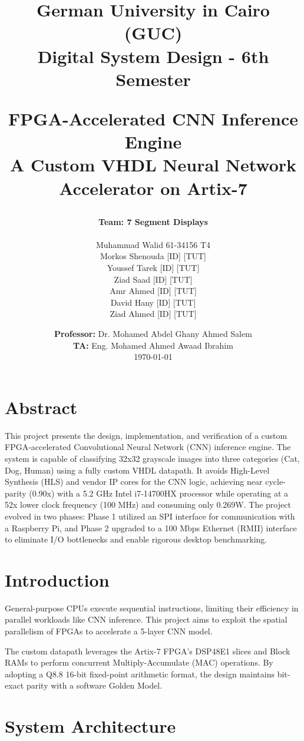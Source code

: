 \documentclass[12pt,a4paper]{article}
\title{
    \vspace{-2cm}
    \begin{center}
        \Large \textbf{German University in Cairo (GUC)} \\
        \large Digital System Design - 6th Semester \\
    \end{center}
    \vspace{2cm}
    \textbf{FPGA-Accelerated CNN Inference Engine} \\
    \large A Custom VHDL Neural Network Accelerator on Artix-7
}
\author{
    \textbf{Team: 7 Segment Displays} \\[0.5cm]
    \normalsize
    \begin{tabular}{c}
        Muhammad Walid 61-34156 T4 \\
        Morkos Shenouda [ID] [TUT] \\
        Youssef Tarek [ID] [TUT] \\
        Ziad Saad [ID] [TUT] \\
        Amr Ahmed [ID] [TUT] \\
        David Hany [ID] [TUT] \\
        Ziad Ahmed [ID] [TUT]
    \end{tabular}
}
\date{\vspace{1cm}
    \textbf{Professor:} Dr. Mohamed Abdel Ghany Ahmed Salem \\
    \textbf{TA:} Eng. Mohamed Ahmed Awaad Ibrahim \\
    \today
}
\begin{document}
\maketitle
\newpage
\tableofsections
\tableofcontents
\newpage

\section{Abstract}
This project presents the design, implementation, and verification of a custom FPGA-accelerated Convolutional Neural Network (CNN) inference engine. The system is capable of classifying 32x32 grayscale images into three categories (Cat, Dog, Human) using a fully custom VHDL datapath. It avoids High-Level Synthesis (HLS) and vendor IP cores for the CNN logic, achieving near cycle-parity (0.90x) with a 5.2 GHz Intel i7-14700HX processor while operating at a 52x lower clock frequency (100 MHz) and consuming only 0.269W. The project evolved in two phases: Phase 1 utilized an SPI interface for communication with a Raspberry Pi, and Phase 2 upgraded to a 100 Mbps Ethernet (RMII) interface to eliminate I/O bottlenecks and enable rigorous desktop benchmarking.

\section{Introduction}
General-purpose CPUs execute sequential instructions, limiting their efficiency in parallel workloads like CNN inference. This project aims to exploit the spatial parallelism of FPGAs to accelerate a 5-layer CNN model. 

The custom datapath leverages the Artix-7 FPGA's DSP48E1 slices and Block RAMs to perform concurrent Multiply-Accumulate (MAC) operations. By adopting a Q8.8 16-bit fixed-point arithmetic format, the design maintains bit-exact parity with a software Golden Model.

\section{System Architecture}
\end{document}
